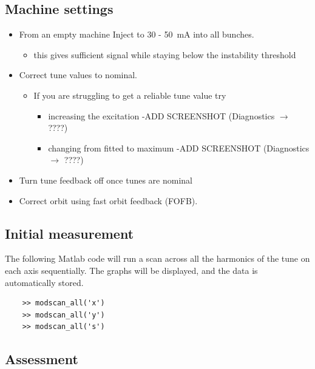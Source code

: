 \documentclass{report}
\begin{document}
\subsection{Machine settings}
\begin{itemize}
    \item {From an empty machine Inject to 30 - 50~mA into all bunches.}
    \begin{itemize}
    \item{this gives sufficient signal while staying below the instability threshold}
    \end{itemize}
    \item{Correct tune values to nominal.}
    \begin{itemize}
        \item{If you are struggling to get a reliable tune value try}
        \begin{itemize}
            \item{increasing the excitation -{\color{red}ADD SCREENSHOT} (Diagnostics $\rightarrow$ {\color{red}????})}
            \item{changing from fitted to maximum -{\color{red}ADD SCREENSHOT} (Diagnostics $\rightarrow$ {\color{red}????})}
        \end{itemize}
    \end{itemize}
    \item{Turn tune feedback off once tunes are nominal}
    \item{Correct orbit using fast orbit feedback (FOFB).}
\end{itemize}

\subsection{Initial measurement}
The following Matlab code will run a scan across all the harmonics of the tune on each axis sequentially. The graphs will be displayed, and the data is automatically stored.
\begin{verbatim}
    >> modscan_all('x') 
    >> modscan_all('y') 
    >> modscan_all('s') 
\end{verbatim}
\clearpage
\subsection{Assessment} 
\end{document}
